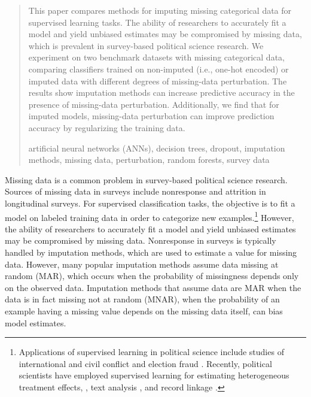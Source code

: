 \documentclass[10pt]{book}
\theoremstyle{definition}
\begin{document}
\begin{quotation}
This paper compares methods for imputing missing categorical data for supervised learning tasks. The ability of researchers to accurately fit a model and yield unbiased estimates may be compromised by missing data, which is prevalent in survey-based political science research. We experiment on two benchmark datasets with missing categorical data, comparing classifiers trained on non-imputed (i.e., one-hot encoded) or imputed data with different degrees of missing-data perturbation. The results show imputation methods can increase predictive accuracy in the presence of missing-data perturbation. Additionally, we find that for imputed models, missing-data perturbation can improve prediction accuracy by regularizing the training data. \par

\vspace{9pt}
artificial neural networks (ANNs), decision trees, dropout, imputation methods, missing data,  perturbation, random forests, survey data
\par
\end{quotation}\par



\def\thefigure{\arabic{figure}}
\def\thetable{\arabic{table}}

\fontsize{12}{14pt plus.8pt minus .6pt}\selectfont

\newpage %

\setcounter{chapter}{1}
\setcounter{equation}{0} %
\setcounter{page}{1} %

Missing data is a common problem in survey-based political science research. Sources of missing data in surveys include nonresponse and attrition in longitudinal surveys. For supervised classification tasks, the objective is to fit a model on labeled training data in order to categorize new examples.\footnote{Applications of supervised learning in political science include studies of international and civil conflict\citep{beck2000,de2004,hill2014,muchlinski2016} and election fraud \citep{cantu2011,montgomery2015}. Recently, political scientists have employed supervised learning for estimating heterogeneous treatment effects, \citep{imai2011,green2012, imai2013, grimmer2014}, text analysis \citep{quinn2010,hopkins2010,grimmer2013,lauderdale2014,wilkerson2015}, and record linkage \citep{giraud2010}.} However, the ability of researchers to accurately fit a model and yield unbiased estimates may be compromised by missing data. Nonresponse in surveys is typically handled by imputation methods, which are used to estimate a value for missing data. However, many popular imputation methods assume data missing at random (MAR), which occurs when the probability of missingness depends only on the observed data. Imputation methods that assume data are MAR when the data is in fact missing not at random (MNAR), when the probability of an example having a missing value depends on the missing data itself, can bias model estimates. 
\end{document}

